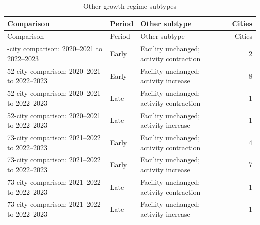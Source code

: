 \begingroup\scriptsize\setlength{\tabcolsep}{3pt}\begin{longtable}{@{}p{42mm}llr@{}}\caption{Other growth-regime subtypes}\label{tab:growth_transition_other}\\\toprule
Comparison & Period & Other subtype & Cities\\
\midrule\endfirsthead\toprule
Comparison & Period & Other subtype & Cities\\
\midrule\endhead\bottomrule\endfoot
52-city comparison: 2020--2021 to 2022--2023 & Early & Facility unchanged; activity contraction & 2\\
52-city comparison: 2020--2021 to 2022--2023 & Early & Facility unchanged; activity increase & 8\\
52-city comparison: 2020--2021 to 2022--2023 & Late & Facility unchanged; activity contraction & 1\\
52-city comparison: 2020--2021 to 2022--2023 & Late & Facility unchanged; activity increase & 1\\
73-city comparison: 2021--2022 to 2022--2023 & Early & Facility unchanged; activity contraction & 4\\
73-city comparison: 2021--2022 to 2022--2023 & Early & Facility unchanged; activity increase & 7\\
73-city comparison: 2021--2022 to 2022--2023 & Late & Facility unchanged; activity contraction & 1\\
73-city comparison: 2021--2022 to 2022--2023 & Late & Facility unchanged; activity increase & 1\\
\end{longtable}\endgroup
